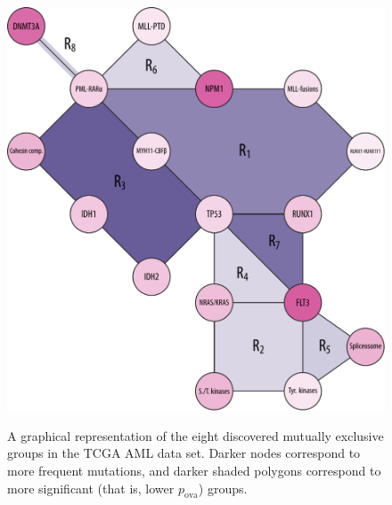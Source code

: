 \begin{figure}[htbp]
\centering
\includegraphics[width=\textwidth]{figures/genes/graph_aml.pdf}\\[2em]
\caption{A graphical representation of the eight discovered mutually exclusive groups in the TCGA AML data set.
Darker nodes correspond to more frequent mutations, and darker shaded polygons correspond to more significant (that is, lower $p_{\mathrm{ova}}$) groups.}
\label{fig:graph_aml}
\end{figure}

